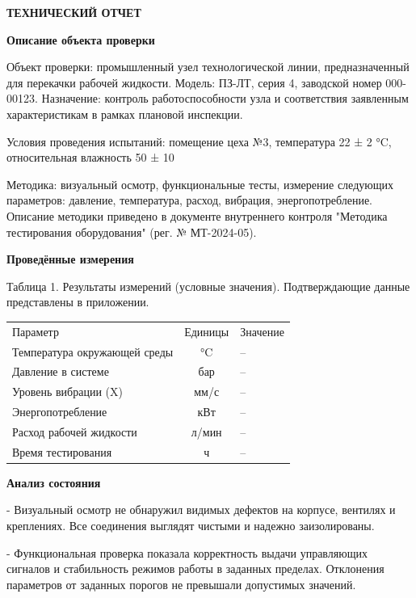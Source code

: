 \documentclass[12pt]{article}
\begin{document}
\begin{center}
\textbf{\LARGE ТЕХНИЧЕСКИЙ ОТЧЕТ}
\end{center}

\vspace{1cm}


\textbf{Описание объекта проверки}

Объект проверки: промышленный узел технологической линии, предназначенный для перекачки рабочей жидкости. Модель: ПЗ-ЛТ, серия 4, заводской номер 000-00123. Назначение: контроль работоспособности узла и соответствия заявленным характеристикам в рамках плановой инспекции. 

Условия проведения испытаний: помещение цеха №3, температура 22 ± 2 °C, относительная влажность 50 ± 10%

Методика: визуальный осмотр, функциональные тесты, измерение следующих параметров: давление, температура, расход, вибрация, энергопотребление. Описание методики приведено в документе внутреннего контроля "Методика тестирования оборудования" (рег. № МТ-2024-05).

\textbf{Проведённые измерения}

Таблица 1. Результаты измерений (условные значения). Подтверждающие данные представлены в приложении.

\begin{tabular}{p{6cm} c p{3cm}}
Параметр & Единицы & Значение \\
Температура окружающей среды & °C & -- \\
Давление в системе & бар & -- \\
Уровень вибрации (X) & мм/с & -- \\
Энергопотребление & кВт & -- \\
Расход рабочей жидкости & л/мин & -- \\
Время тестирования & ч & -- \\
\end{tabular}

\textbf{Анализ состояния}

- Визуальный осмотр не обнаружил видимых дефектов на корпусе, вентилях и креплениях. Все соединения выглядят чистыми и надежно заизолированы.

- Функциональная проверка показала корректность выдачи управляющих сигналов и стабильность режимов работы в заданных пределах. Отклонения параметров от заданных порогов не превышали допустимых значений.
\end{document}
